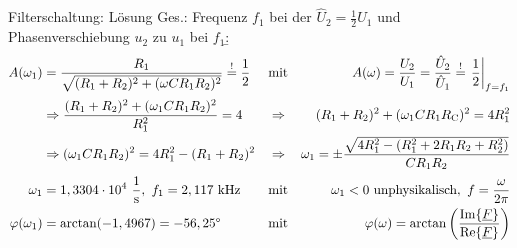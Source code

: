 \begin{frame}[allowframebreaks]
\begin{bsp}{Filterschaltung: Lösung}{}
	Ges.: Frequenz $f_{1}$ bei der $\hat{U}_2 = \frac{1}{2}\hat{U}_1$ und Phasenverschiebung $u_2$ zu $u_1$ bei $f_1$:\b{\hfill}\vspace{-10pt}%
    \begin{align*}%
        A(\omega_1) &= \frac{R_1}{\sqrt{(R_1+R_2)^2+(\omega CR_1R_2)^2}} \overset{!}{=} \frac{1}{2} & 
        &\text{mit}&
        A(\omega) = \frac{U_2}{U_1} = \frac{\hat{U}_2}{\hat{U}_1} \overset{!}{=} \left.\frac{1}{2}\right|_{f=f_1}
        \\[+2pt]
        &\Rightarrow \frac{(R_1+R_2)^2 + (\omega_1 CR_1R_2)^2}{R_1^2} = 4 &
        &\Rightarrow &
        (R_1+R_2)^2 + (\omega_1 C R_1R_{\mathrm{C}})^2 = 4R_1^2
        \\
        &\Rightarrow (\omega_1 CR_1R_2)^2 = 4R_1^2 - (R_1+R_2)^2 &
        &\Rightarrow&
        \omega_1 = \pm \frac{\sqrt{4R_1^2 - (R_1^2 + 2R_1R_2 + R_2^2)}}{CR_1R_2}
        \\[+2pt]
        \omega_1 &= 1,3304\cdot 10^4\ \frac{1}{\mathrm{s}},\ f_1 = 2,117\ \mathrm{kHz} &
        &\text{mit}&
        \omega_1 < 0 \text{ unphysikalisch},\ f=\frac{\omega}{2\pi}
        \\
        \varphi(\omega_1) &= \arctan(-1,4967) = -56,25\degree &
        &\text{mit}&
        \varphi(\omega) = \arctan\left(\frac{\Im\{\underline{F}\}}{\Re\{\underline{F}\}}\right)
    \end{align*}
\end{bsp}%
\end{frame}


